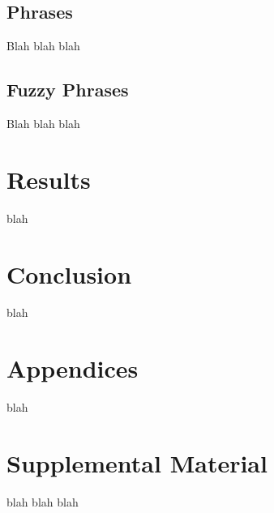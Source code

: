 \documentclass[11pt,a4paper]{article}
\begin{document}
\subsection{Phrases}

Blah blah blah

\subsection{Fuzzy Phrases}

Blah blah blah

\section{Results}

blah

\section{Conclusion}

blah




\appendix

\section{Appendices}
\label{sec:appendix}

blah 

\section{Supplemental Material}
\label{sec:supplemental}
blah blah blah
\end{document}

